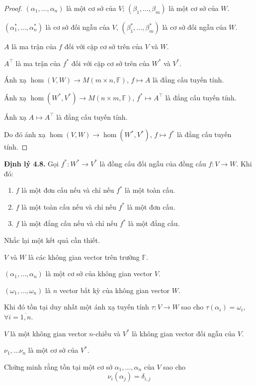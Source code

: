 \begin{proof}
    $(\alpha_{1}, \ldots, \alpha_{n})$ là một cơ sở của $V$; $(\beta_{1}, \ldots, \beta_{m})$ là một cơ sở của $W$.
    
    $(\alpha^{*}_{1}, \ldots, \alpha^{*}_{n})$ là cơ sở đối ngẫu của $V$, $(\beta^{*}_{1}, \ldots, \beta^{*}_{m})$ là cơ sở đối ngẫu của $W$.
    
    $A$ là ma trận của $f$ đối với cặp cơ sở trên của $V$ và $W$.
    
    $A^{\top}$ là ma trận của $f^{*}$ đối với cặp cơ sở trên của $W^{*}$ và $V^{*}$.
    
    Ánh xạ $\hom(V,W)\to M(m\times n,\mathbb{F})$, $f\mapsto A$ là đẳng cấu tuyến tính.
    
    Ánh xạ $\hom(W^{*},V^{*})\to M(n\times m,\mathbb{F})$, $f^{*}\mapsto A^{\top}$ là đẳng cấu tuyến tính.
    
    Ánh xạ $A\mapsto A^{\top}$ là đẳng cấu tuyến tính.
    
    Do đó ánh xạ $\hom(V,W)\to\hom(W^{*},V^{*})$, $f\mapsto f^{*}$ là đẳng cấu tuyến tính.
\end{proof}

\noindent\textbf{Định lý 4.8.} Gọi $f^{*}: W^{*}\to V^{*}$ là đồng cấu đối ngẫu của đồng cấu $f: V\to W$. Khi đó:
\begin{enumerate}[label = (\arabic*)]
    \item $f$ là một đơn cấu nếu và chỉ nếu $f^{*}$ là một toàn cấu.
    \item $f$ là một toàn cấu nếu và chỉ nếu $f^{*}$ là một đơn cấu.
    \item $f$ là một đẳng cấu nếu và chỉ nếu $f^{*}$ là một đẳng cấu.
\end{enumerate}

Nhắc lại một kết quả cần thiết.
\begin{lemma}
    $V$ và $W$ là các không gian vector trên trường $\mathbb{F}$.
    
    $(\alpha_{1}, \ldots, \alpha_{n})$ là một cơ sở của không gian vector $V$.
    
    $(\omega_{1}, \ldots, \omega_{n})$ là $n$ vector bất kỳ của không gian vector $W$.
    
    Khi đó tồn tại duy nhất một ánh xạ tuyến tính $\tau: V\to W$ sao cho $\tau(\alpha_{i}) = \omega_{i}$, $\forall i = \overline{1,n}$.
\end{lemma}

\begin{lemma}
    $V$ là một không gian vector $n$-chiều và ${V}^{*}$ là không gian vector đối ngẫu của $V$.
    
    ${\nu}_{1}, \ldots {\nu}_{n}$ là một cơ sở của ${V}^{*}$.
    
    Chứng minh rằng tồn tại một cơ sở $\alpha_{1}, \ldots, \alpha_{n}$ của $V$ sao cho
    \[
        {\nu}_{i}(\alpha_{j}) = \delta_{i,j}
    \]
\end{lemma}

